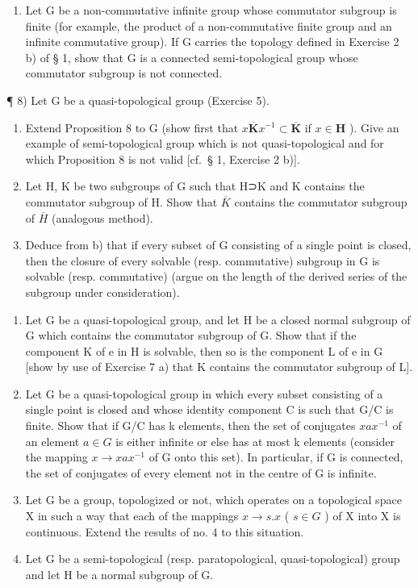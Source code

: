 \begin{enumerate}
\def\labelenumi{\alph{enumi})}
\setcounter{enumi}{1}
\tightlist
\item
  Let G be a non-commutative infinite group whose commutator subgroup is finite (for example, the product of a non-commutative finite group and an infinite commutative group). If G carries the topology defined in Exercise 2 b) of § 1, show that G is a connected semi-topological group whose commutator subgroup is not connected.
\end{enumerate}

¶ 8) Let G be a quasi-topological group (Exercise 5).

\begin{enumerate}
\def\labelenumi{\alph{enumi})}
\item
  Extend Proposition 8 to G (show first that \(x\overline{\mathbf{K}}x^{-1} \subset \overline{\mathbf{K}}\) if \(x \in \mathbf{H}\) ). Give an example of semi-topological group which is not quasi-topological and for which Proposition 8 is not valid {[}cf.~§ 1, Exercise 2 b){]}.
\item
  Let H, K be two subgroups of G such that H⊃K and K contains the commutator subgroup of H. Show that \(\overline{K}\) contains the commutator subgroup of \(\overline{H}\) (analogous method).
\item
  Deduce from b) that if every subset of G consisting of a single point is closed, then the closure of every solvable (resp. commutative) subgroup in G is solvable (resp. commutative) (argue on the length of the derived series of the subgroup under consideration).
\end{enumerate}

\begin{enumerate}
\def\labelenumi{\arabic{enumi})}
\setcounter{enumi}{8}
\item
  Let G be a quasi-topological group, and let H be a closed normal subgroup of G which contains the commutator subgroup of G. Show that if the component K of e in H is solvable, then so is the component L of e in G {[}show by use of Exercise 7 a) that K contains the commutator subgroup of L{]}.
\item
  Let G be a quasi-topological group in which every subset consisting of a single point is closed and whose identity component C is such that G/C is finite. Show that if G/C has k elements, then the set of conjugates \(xax^{-1}\) of an element \(a \in G\) is either infinite or else has at most k elements (consider the mapping \(x \rightarrow xax^{-1}\) of G onto this set). In particular, if G is connected, the set of conjugates of every element not in the centre of G is infinite.
\item
  Let G be a group, topologized or not, which operates on a topological space X in such a way that each of the mappings \(x \rightarrow s.x\) ( \(s \in G\) ) of X into X is continuous. Extend the results of no. 4 to this situation.
\item
  Let G be a semi-topological (resp. paratopological, quasi-topological) group and let H be a normal subgroup of G.
\end{enumerate}

